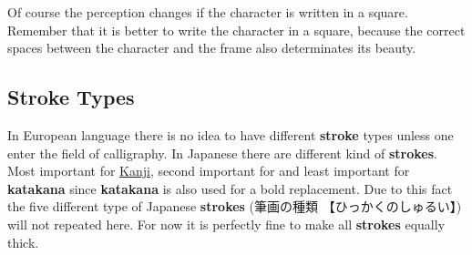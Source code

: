 \bigskip


\bigskip

Of course the perception changes if the character is written in a square.
Remember that it is better to write the character in a square, because the
correct spaces between the character and the frame also determinates its
beauty.

\bigskip


\bigskip

\subsection{Stroke Types}
\label{sec:StrokeTypes}
\label{sec:Stroke}
\label{subsec:StrokeTypes}

In European language there is no idea to have different \textbf{stroke} types
unless one enter the field of calligraphy. In Japanese there are different kind
of \textbf{strokes}.  Most important for \hyperref[sec:Kanji]{Kanji}, second
important for \hyperref[sec:\jscript{}]{\jtopic{}} and least important for
\textbf{katakana} since \textbf{katakana} is also used for a bold replacement.
Due to this fact the five different type of Japanese \textbf{strokes}
({筆画の種類} {【ひっかくのしゅるい】}) will not repeated here. For now it is
perfectly fine to make all \textbf{strokes} equally thick.


